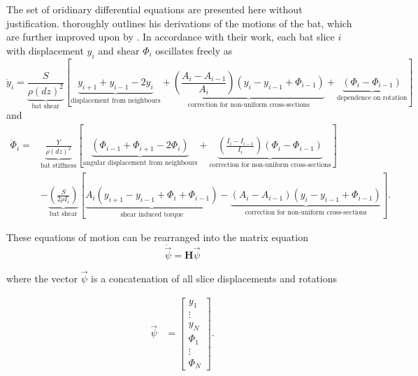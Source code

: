 \documentclass[linenumbers]{aastex7}
\begin{document}
The set of oridinary differential equations are presented here without justification. \citet{vanzandtDynamicalTheoryBaseball1992} thoroughly outlines his derivations of the motions of the bat, which are further improved upon by \citet{nathanDynamicsBaseballBat2000a}. In accordance with their work, each bat slice $i$ with displacement $y_i$ and shear $\Phi_i$ oscillates freely as
\begin{equation}\label{eq:yode}
	\ddot{y}_i = \underbrace{\frac{S}{\rho (dz)^2}}_{\text{bat shear}}\left[\underbrace{y_{i+1} + y_{i-1} -2y_i}_{\text{displacement from neighbours}} + \underbrace{\left(\frac{A_i-A_{i-1}}{A_i}\right)(y_i - y_{i-1} + \Phi_{i-1})}_{\text{correction for non-uniform cross-sections}} + \underbrace{(\Phi_i -\Phi_{i-1})}_{\text{dependence on rotation}}\right]
\end{equation}
and
\begin{align}\label{eq:phiode}
	\ddot{\Phi}_i = & \underbrace{\frac{Y}{\rho (dz)^2}}_{\text{bat stiffness}}\left[\underbrace{(\Phi_{i-1} + \Phi_{i+1} -2\Phi_i)}_{\text{angular displacement from neighbours}} + \underbrace{\left( \frac{I_i - I_{i-1}}{I_i} \right)(\Phi_i - \Phi_{i-1})}_{\text{correction for non-uniform cross-sections}} \right] \\ \nonumber &- \underbrace{\left(\frac{S}{2\rho I_i}\right)}_{\text{bat shear}}\left[\underbrace{A_i (y_{i+1} - y_{i-1} + \Phi_i + \Phi_{i-1})}_{\text{shear induced torque}}- \underbrace{(A_i - A_{i-1}) (y_i - y_{i-1} + \Phi_{i-1})}_{\text{correction for non-uniform cross-sections}}\right].
\end{align}

These equations of motion can be rearranged into the matrix equation
\begin{equation}\label{eq:matrixeq}
	\ddot{\vec{\psi}} = \mathbf{H}\vec{\psi}
\end{equation}

where the vector $\vec{\psi}$ is a concatenation of all slice displacements and rotations

\begin{align}
	\vec{\psi} & = \begin{bmatrix}
		               y_1 \\ \vdots \\ y_N \\ \Phi_1 \\ \vdots \\ \Phi_N
	               \end{bmatrix}.
\end{align}
\end{document}
